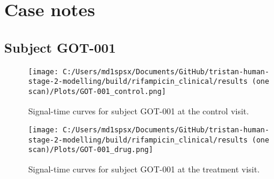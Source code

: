 \documentclass{epflreport}%
\begin{document}
\section{Case notes}%
\label{sec:Casenotes}%

%
\subsection{Subject GOT{-}001}%
\label{subsec:SubjectGOT{-}001}%

%


\begin{figure}[h!]%
\centering%
\texttt{[image: C:/Users/md1spsx/Documents/GitHub/tristan-human-stage-2-modelling/build/rifampicin\_clinical/results (one scan)/Plots/GOT-001\_control.png]}%
\caption{Signal{-}time curves for subject GOT{-}001 at the control visit.}%
\end{figure}

%


\begin{figure}[h!]%
\centering%
\texttt{[image: C:/Users/md1spsx/Documents/GitHub/tristan-human-stage-2-modelling/build/rifampicin\_clinical/results (one scan)/Plots/GOT-001\_drug.png]}%
\caption{Signal{-}time curves for subject GOT{-}001 at the treatment visit.}%
\end{figure}
\end{document}
